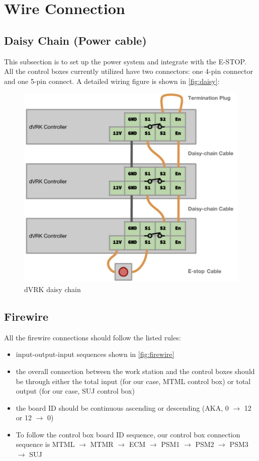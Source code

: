 \section{Wire Connection}

\subsection{Daisy Chain (Power cable)}

This subsection is to set up the power system and integrate with the E-STOP. All the control boxes currently utilized have two connectors: one 4-pin connector and one 5-pin connect. A detailed wiring figure is shown in \autoref{fig:daisy}:

\begin{figure}[H]
    \centering 
    \includegraphics[width=0.7\linewidth]{figures/daisy_chain.jpg}
    \caption{dVRK daisy chain}
    \label{fig:daisy}
\end{figure}

\subsection{Firewire}

All the firewire connections should follow the listed rules:

\begin{itemize}
    \item input-output-input sequences shown in \autoref{fig:firewire}
    \item the overall connection between the work station and the control boxes should be through either the total input (for our case, MTML control box) or total output (for our case, SUJ control box)
    \item the board ID should be continuous ascending or descending (AKA, 0 $\rightarrow$ 12 or 12 $\rightarrow$ 0)
    \item To follow the control box board ID sequence, our control box connection sequence is MTML $\rightarrow$ MTMR $\rightarrow$ ECM $\rightarrow$ PSM1 $\rightarrow$ PSM2 $\rightarrow$ PSM3 $\rightarrow$ SUJ
\end{itemize}

